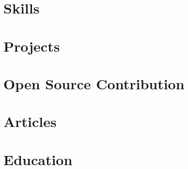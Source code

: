 \documentclass[letter, 11pt]{article}
\begin{document}


\section{Skills}


\section{Projects}


\section{Open Source Contribution}


\section{Articles}


\section{Education}

\end{document}
